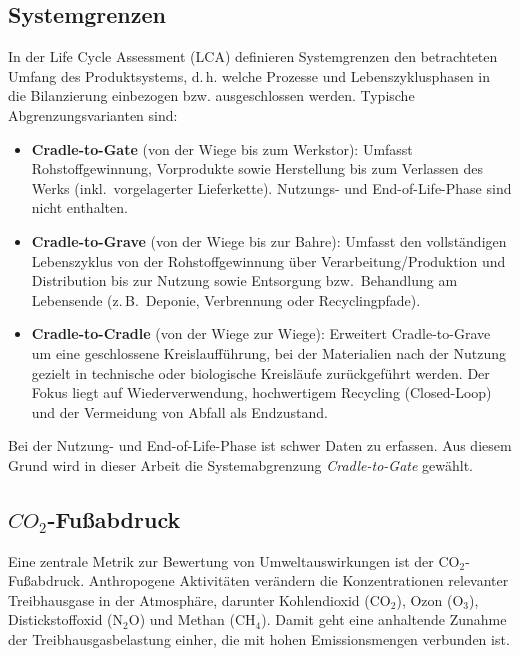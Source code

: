 \subsection{Systemgrenzen}
In der Life Cycle Assessment (LCA) definieren Systemgrenzen den betrachteten Umfang des Produktsystems, d.\,h. welche Prozesse und Lebenszyklusphasen in die Bilanzierung einbezogen bzw. ausgeschlossen werden. \cite{el2010sustainable}
Typische Abgrenzungsvarianten sind:

\begin{itemize}
	\item \textbf{Cradle-to-Gate} (von der Wiege bis zum Werkstor):
	Umfasst Rohstoffgewinnung, Vorprodukte sowie Herstellung bis zum Verlassen des Werks (inkl.\ vorgelagerter Lieferkette). Nutzungs- und End-of-Life-Phase sind nicht enthalten. \cite{kim2016cradle}
	
	\item \textbf{Cradle-to-Grave} (von der Wiege bis zur Bahre):
	Umfasst den vollständigen Lebenszyklus von der Rohstoffgewinnung über Verarbeitung/Produktion und Distribution bis zur Nutzung sowie Entsorgung bzw.\ Behandlung am Lebensende (z.\,B.\ Deponie, Verbrennung oder Recyclingpfade). \cite{mcdonough2010cradle}
	
	\item \textbf{Cradle-to-Cradle} (von der Wiege zur Wiege):
	Erweitert Cradle-to-Grave um eine geschlossene Kreislaufführung, bei der Materialien nach der Nutzung gezielt in technische oder biologische Kreisläufe zurückgeführt werden. Der Fokus liegt auf Wiederverwendung, hochwertigem Recycling (Closed-Loop) und der Vermeidung von Abfall als Endzustand. \cite{braungart2009cradle}
\end{itemize}

Bei der Nutzung- und End-of-Life-Phase ist schwer Daten zu erfassen. Aus diesem Grund wird in dieser Arbeit die Systemabgrenzung \textit{Cradle-to-Gate} gewählt. 

\subsection{\(CO_{2}\)-Fußabdruck}
Eine zentrale Metrik zur Bewertung von Umweltauswirkungen ist der \(\mathrm{CO_2}\)-Fußabdruck.
Anthropogene Aktivitäten verändern die Konzentrationen relevanter Treibhausgase in der Atmosphäre, darunter Kohlendioxid (\(\mathrm{CO_2}\)), Ozon (\(\mathrm{O_3}\)), Distickstoffoxid (\(\mathrm{N_2O}\)) und Methan (\(\mathrm{CH_4}\)). \cite{schonbeckzukunft}
Damit geht eine anhaltende Zunahme der Treibhausgasbelastung einher, die mit hohen Emissionsmengen verbunden ist.

